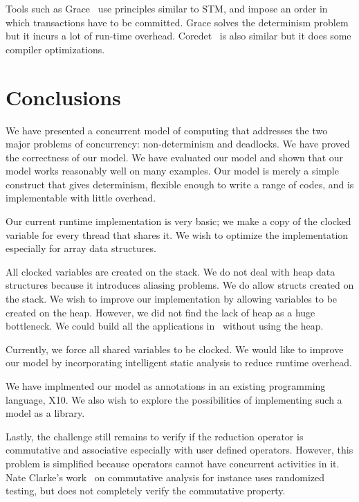 \documentclass[10pt, conference, compsocconf]{IEEEtran}
\begin{document}
Tools such as Grace~\cite{berger2009grace} use principles similar to STM, and impose 
an order in which transactions have to be committed. Grace solves the determinism problem 
but it incurs a lot of run-time overhead. Coredet~\cite{bergan2010coredet} is also similar but it does some compiler optimizations. 




\section{Conclusions}
\label{sec:conclusions}
We have presented a concurrent model of computing that addresses the
two major problems of concurrency: non-determinism and deadlocks.
We have proved the correctness of our model. We have evaluated
our model and shown that our model works reasonably well on many
examples.
Our model is merely a simple construct that gives determinism,
flexible enough to write a range of codes, and is implementable with little overhead.

Our current runtime implementation is very basic; we make a copy
of the clocked variable for every thread that shares it.  
We wish to optimize
the implementation especially for array data structures.

All clocked variables are created on the stack.
We do not deal with heap data structures because
it introduces aliasing problems. We do allow structs
created on the stack.
We wish to improve
our implementation by allowing variables to be created on the heap.
However, we did not find the lack of heap as a huge bottleneck.
We could build all the applications in~ without
using the heap.

Currently, we force all shared variables to be clocked. We would
like to improve our model by incorporating intelligent
static analysis to reduce runtime overhead.


We have implmented our model as annotations in an existing
programming language, X10.
We also wish to explore the possibilities of implementing such a model
as a library.

Lastly, the challenge still remains to verify if the reduction operator
is commutative and associative especially with user defined operators.
However, this problem is simplified because operators cannot
have concurrent activities in it.
Nate Clarke's work~\cite{aleen2009commutativity} on commutative
analysis for instance uses randomized testing, but does not completely
verify the commutative property.





\end{document}
